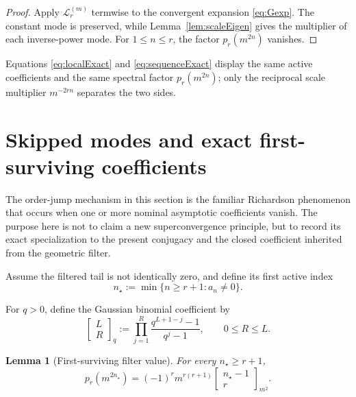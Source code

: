 \documentclass[11pt]{article}
\newtheorem{lemma}[theorem]{Lemma}
\theoremstyle{remark}
\newcommand{\Lop}{\mathcal L}
\begin{document}
\begin{proof}
Apply \(\Lop_r^{(m)}\) termwise to the convergent expansion
\eqref{eq:Gexp}.  The constant mode is preserved, while
Lemma~\ref{lem:scaleEigen} gives the multiplier of each inverse-power
mode.  For \(1\le n\le r\), the factor \(p_r(m^{2n})\) vanishes.
\end{proof}

Equations \eqref{eq:localExact} and \eqref{eq:sequenceExact} display the
same active coefficients and the same spectral factor
\(p_r(m^{2n})\); only the reciprocal scale multiplier \(m^{-2rn}\)
separates the two sides.

\section{Skipped modes and exact first-surviving coefficients}

The order-jump mechanism in this section is the familiar Richardson
phenomenon that occurs when one or more nominal asymptotic coefficients
vanish.  The purpose here is not to claim a new superconvergence principle,
but to record its exact specialization to the present conjugacy and the
closed coefficient inherited from the geometric filter.

Assume the filtered tail is not identically zero, and define its first
active index
\begin{equation}
n_\star
:=
\min\{n\ge r+1:a_n\neq0\}.
\label{eq:nstar}
\end{equation}

For \(q>0\), define the Gaussian binomial coefficient by
\begin{equation}
\begin{bmatrix}L\\R\end{bmatrix}_q
:=
\prod_{j=1}^R
\frac{q^{L+1-j}-1}{q^j-1},
\qquad
0\le R\le L.
\label{eq:qbinom}
\end{equation}

\begin{lemma}[First-surviving filter value]
\label{lem:qbinom}
For every \(n_\star\ge r+1\),
\begin{equation}
\boxed{
p_r(m^{2n_\star})
=
(-1)^r m^{r(r+1)}
\begin{bmatrix}n_\star-1\\r\end{bmatrix}_{m^2}.
}
\label{eq:pqbinom}
\end{equation}
\end{lemma}
\end{document}
